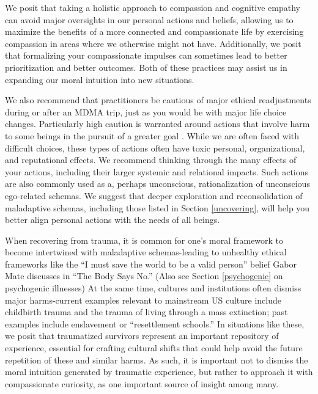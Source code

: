 \documentclass[12pt,letterpaper]{book}
\begin{document}
We posit that taking a holistic approach to compassion and cognitive empathy can avoid major oversights in our personal actions and beliefs, allowing us to maximize the benefits of a more connected and compassionate life by exercising compassion in areas where we otherwise might not have. Additionally, we posit that formalizing your compassionate impulses can sometimes lead to better prioritization and better outcomes. Both of these practices may assist us in expanding our moral intuition into new situations.

We also recommend that practitioners be cautious of major ethical readjustments during or after an MDMA trip, just as you would be with major life choice changes. Particularly high caution is warranted around actions that involve harm to some beings in the pursuit of a greater goal \cite{askellSelfServing}. While we are often faced with difficult choices, these types of actions often have toxic personal, organizational, and reputational effects. We recommend thinking through the many effects of your actions, including their larger systemic and relational impacts. Such actions are also commonly used as a, perhaps unconscious, rationalization of unconscious ego-related schemas. We suggest that deeper exploration and reconsolidation of maladaptive schemas, including those listed in Section \ref{uncovering}, will help you better align personal actions with the needs of all beings.

When recovering from trauma, it is common for one's moral framework to become intertwined with maladaptive schemas-leading to unhealthy ethical frameworks like the “I must save the world to be a valid person” belief Gabor Mate discusses in “The Body Says No.” (Also see Section \ref{psychogenic} on psychogenic illnesses) At the same time, cultures and institutions often dismiss major harms-current examples relevant to mainstream US culture include childbirth trauma and the trauma of living through a mass extinction; past examples include enslavement or “resettlement schools.” In situations like these, we posit that traumatized survivors represent an important repository of experience, essential for crafting cultural shifts that could help avoid the future repetition of these and similar harms. As such, it is important not to dismiss the moral intuition generated by traumatic experience, but rather to approach it with compassionate curiosity, as one important source of insight among many.
\end{document}
